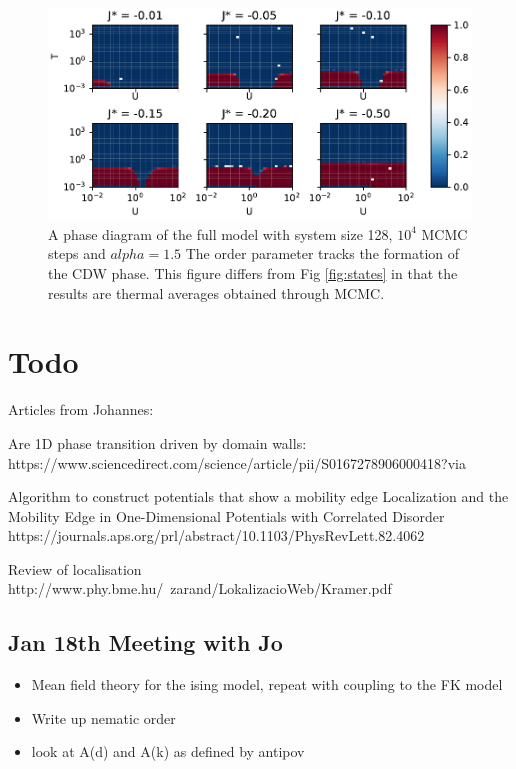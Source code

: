 \documentclass[a4paper, 11pt, onecolumn]{article}
\begin{document}
\begin{figure}
  \centering
    \includegraphics[width=1.2\textwidth]{phase_diagram_5_log}
  \caption{A phase diagram of the full model with system size 128, $10^4$ MCMC steps and $alpha = 1.5$ The order parameter tracks the formation of the CDW phase. This figure differs from Fig \ref{fig:states} in that the results are thermal averages obtained through MCMC.}
  \label{fig:phase_diagram_5_log}
\end{figure}

\section{Todo}
Articles from Johannes:

Are 1D phase transition driven by domain walls: https://www.sciencedirect.com/science/article/pii/S0167278906000418?via%

Algorithm to construct potentials that show a mobility edge
Localization and the Mobility Edge in One-Dimensional Potentials with Correlated Disorder
https://journals.aps.org/prl/abstract/10.1103/PhysRevLett.82.4062

Review of localisation
http://www.phy.bme.hu/~zarand/LokalizacioWeb/Kramer.pdf

\subsection{Jan 18th Meeting with Jo}
\begin{itemize}
    \item Mean field theory for the ising model, repeat with coupling to the FK model
    \item Write up nematic order 
    \item look at A(d) and A(k) as defined by antipov
\end{itemize}
\end{document}
